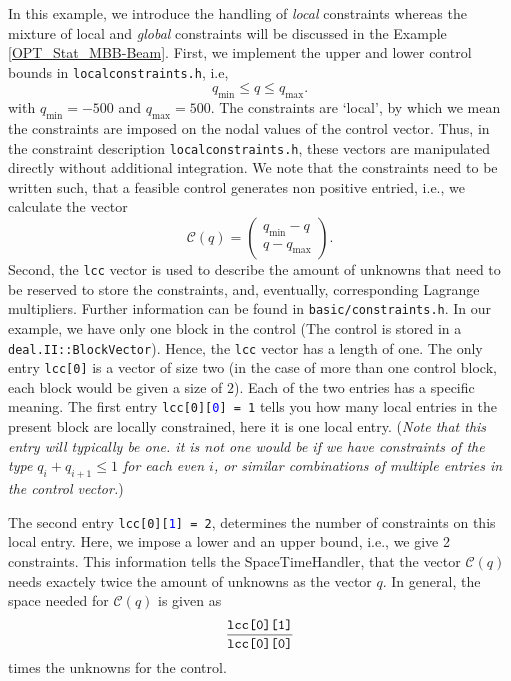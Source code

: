 In this example, we introduce the handling of \textit{local} constraints
whereas the mixture of local and \textit{global} constraints will be discussed
in the Example \ref{OPT_Stat_MBB-Beam}. 
%
First, we implement the upper and lower control bounds in 
\texttt{localconstraints.h}, i.e,
\[
q_{\min} \leq q \leq q_{\max}.
\]
with $q_{\min} = -500$ and $q_{\max} = 500$.
The constraints are `local', by which we mean the constraints are imposed 
on the nodal values of the control vector. Thus, in the constraint 
description \texttt{localconstraints.h},
these vectors are manipulated directly without additional integration. We 
note that the constraints need to be written such, that a feasible control
generates non positive entried, i.e., we 
calculate the vector
\[
 \mathcal C(q) = \begin{pmatrix}
   q_{\min} - q\\q-q_{\max}
 \end{pmatrix}.
 \]
%
Second, the \texttt{lcc} vector is used to describe the amount of unknowns that 
need to be reserved to store the constraints, and, eventually, corresponding 
Lagrange multipliers. 
Further information can be found in \texttt{basic/constraints.h}. 
In our example, we have only one block in the control (The control is stored in 
a \texttt{deal.II::BlockVector}). Hence, the \texttt{lcc} vector has a length of 
one. 
The only entry \texttt{lcc[0]} is a vector of size two (in the case of more than one 
control block, each block would be given a size of $2$). 
Each of the two entries has a specific meaning. 
The first entry \texttt{lcc[0][\textcolor{blue}{0}] = 1} tells 
you how many local entries in the present block are locally constrained, here 
it is one local entry. ({\em Note that this entry will typically be one. 
it is not one  would be if we have constraints of the type $q_{i} + q_{i+1} \le 1$ for each 
even $i$, or similar combinations of multiple entries in the control vector.})

The second entry \texttt{lcc[0][\textcolor{blue}{1}] = 2}, determines the number of 
constraints on this local entry. Here, we impose 
a lower and an upper bound, i.e., we give 2 constraints.
This information tells the SpaceTimeHandler, that the vector 
$\mathcal C(q)$ needs exactely twice the amount of unknowns as the vector $q$.
In general, the space needed for $\mathcal C(q)$ is given as 
\[
\frac{\text{\texttt{lcc[0][1]}}}{\text{\texttt{lcc[0][0]}}}
\]
times the unknowns for the control.

